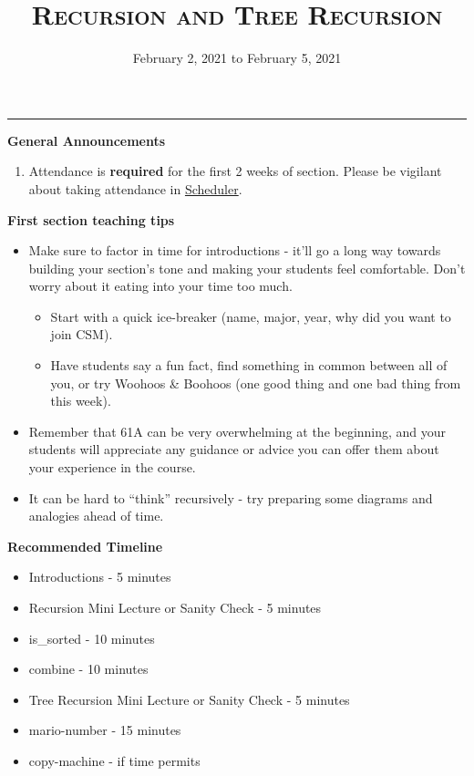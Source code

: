 \documentclass{exam}
\title{\textsc{Recursion and Tree Recursion}}
\date{February 2, 2021 to February 5, 2021}
\begin{document}
\maketitle
\rule{\textwidth}{0.15em}
\fontsize{12}{15}\selectfont

\begin{guide}
\textbf{General Announcements}
\begin{enumerate}
    \item Attendance is \textbf{required} for the first 2 weeks of section. Please be vigilant about taking attendance in \href{scheduler.csmentors.org}{Scheduler}.
\end{enumerate}
\end{guide}

\begin{guide}
\textbf{First section teaching tips}
\begin{itemize}
    \item Make sure to factor in time for introductions - it’ll go a long way towards building your section’s tone and making your students feel comfortable. Don’t worry about it eating into your time too much.
    \begin{itemize}
        \item Start with a quick ice-breaker (name, major, year, why did you want to join CSM).
        \item Have students say a fun fact, find something in common between all of you, or try Woohoos \& Boohoos (one good thing and one bad thing from this week).
    \end{itemize}
    \item Remember that 61A can be very overwhelming at the beginning, and your students will appreciate any guidance or advice you can offer them about your experience in the course. 
    \item It can be hard to ``think'' recursively - try preparing some diagrams and analogies ahead of time.
\end{itemize}
\end{guide}

\begin{guide}
\textbf{Recommended Timeline}
\begin{itemize}
    \item Introductions - 5 minutes
    \item Recursion Mini Lecture or Sanity Check - 5 minutes
    \item is\_sorted - 10 minutes
    \item combine - 10 minutes
    \item Tree Recursion Mini Lecture or Sanity Check - 5 minutes
    \item mario-number - 15 minutes
    \item copy-machine - if time permits
\end{itemize}
\end{guide}
\end{document}

